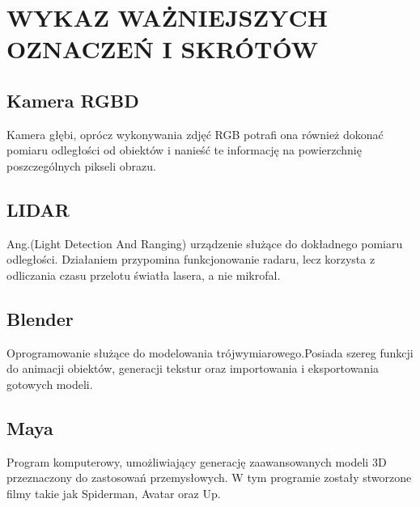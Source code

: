 \chapter{WYKAZ WAŻNIEJSZYCH OZNACZEŃ I SKRÓTÓW}

\section{Kamera RGBD}
Kamera głębi, oprócz wykonywania zdjęć RGB potrafi ona również dokonać pomiaru odległości od obiektów i nanieść te informację na powierzchnię poszczególnych pikseli obrazu.

\section{LIDAR}
Ang.(Light Detection And Ranging) urządzenie służące do dokładnego pomiaru odległości. Działaniem przypomina funkcjonowanie radaru, lecz korzysta z odliczania czasu przelotu światła lasera, a nie mikrofal.

\section{Blender}
Oprogramowanie służące do modelowania trójwymiarowego.Posiada szereg funkcji do animacji obiektów, generacji tekstur oraz importowania i eksportowania gotowych modeli.
\section{Maya}
Program komputerowy, umożliwiający generację zaawansowanych modeli 3D przeznaczony do zastosowań przemysłowych. W tym programie zostały stworzone filmy takie jak Spiderman, Avatar oraz Up.